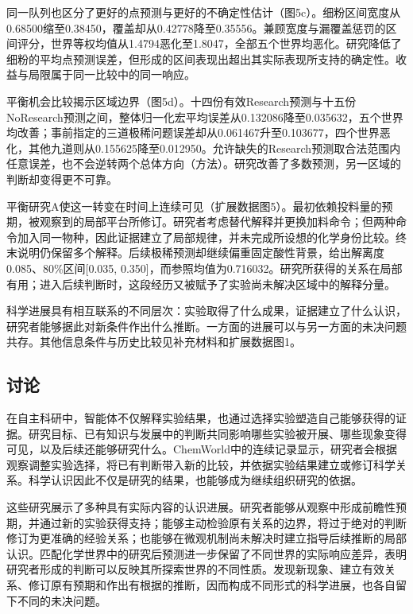\documentclass[10pt,a4paper]{article}
\begin{document}
同一队列也区分了更好的点预测与更好的不确定性估计（图5c）。细粉区间宽度从0.68500缩至0.38450，覆盖却从0.42778降至0.35556。兼顾宽度与漏覆盖惩罚的区间评分，世界等权均值从1.4794恶化至1.8047，全部五个世界均恶化。研究降低了细粉的平均点预测误差，但形成的区间表现出超出其实际表现所支持的确定性。收益与局限属于同一比较中的同一响应。

平衡机会比较揭示区域边界（图5d）。十四份有效Research预测与十五份NoResearch预测之间，整体归一化宏平均误差从0.132086降至0.035632，五个世界均改善；事前指定的三道极稀问题误差却从0.061467升至0.103677，四个世界恶化，其他九道则从0.155625降至0.012950。允许缺失的Research预测取合法范围内任意误差，也不会逆转两个总体方向（方法）。研究改善了多数预测，另一区域的判断却变得更不可靠。

平衡研究A使这一转变在时间上连续可见（扩展数据图5）。最初依赖投料量的预期，被观察到的局部平台所修订。研究者考虑替代解释并更换加料命令；但两种命令加入同一物种，因此证据建立了局部规律，并未完成所设想的化学身份比较。终末说明仍保留多个解释。后续极稀预测却继续偏重固定酸性背景，给出解离度0.085、80\%区间{[}0.035, 0.350{]}，而参照均值为0.716032。研究所获得的关系在局部有用；进入后续判断时，这段经历又被赋予了实验尚未解决区域中的解释分量。

科学进展具有相互联系的不同层次：实验取得了什么成果，证据建立了什么认识，研究者能够据此对新条件作出什么推断。一方面的进展可以与另一方面的未决问题共存。其他信息条件与历史比较见补充材料和扩展数据图1。

\FloatBarrier
\subsection{讨论}\label{ux8ba8ux8bba}

在自主科研中，智能体不仅解释实验结果，也通过选择实验塑造自己能够获得的证据。研究目标、已有知识与发展中的判断共同影响哪些实验被开展、哪些现象变得可见，以及后续还能够研究什么。ChemWorld中的连续记录显示，研究者会根据观察调整实验选择，将已有判断带入新的比较，并依据实验结果建立或修订科学关系。科学认识因此不仅是研究的结果，也能够成为继续组织研究的依据。

这些研究展示了多种具有实际内容的认识进展。研究者能够从观察中形成前瞻性预期，并通过新的实验获得支持；能够主动检验原有关系的边界，将过于绝对的判断修订为更准确的经验关系；也能够在微观机制尚未解决时建立指导后续推断的局部认识。匹配化学世界中的研究后预测进一步保留了不同世界的实际响应差异，表明研究者形成的判断可以反映其所探索世界的不同性质。发现新现象、建立有效关系、修订原有预期和作出有根据的推断，因而构成不同形式的科学进展，也各自留下不同的未决问题。
\end{document}
